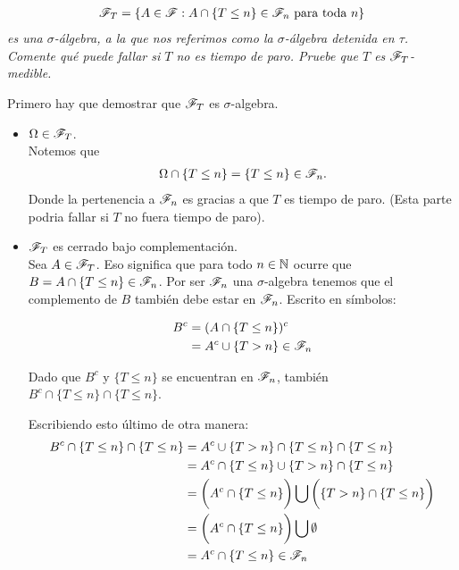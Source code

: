 \emph{
	\begin{align}
		\mathscr{F}_T=\left\{ A\in\mathscr{F}:A\cap\left\{ T\leq n\right\} \in\mathscr{F}_n\text{ para toda } n\right\} 
	\end{align}
	es una $\sigma$-\'algebra, 
	a la que nos referimos como la $\sigma$-\'algebra detenida en $\tau$. Comente qu\'e puede fallar si $T$ no es tiempo de paro. 
	Pruebe que $T$ es $\mathscr{F}_T$-medible.\\		
}			
		
	Primero hay que demostrar que $\mathscr{F}_T$ es $\sigma$-algebra.\\
	
	\begin{itemize}
		\item $\Omega \in \mathscr{F}_T$. \\
		
			Notemos que 
			\begin{align}
				\Omega \cap \{T \leq n\} = \{T \leq n\} \in \mathscr{F}_n.
			\end{align}
			Donde la pertenencia a $\mathscr{F}_n$ es gracias a que $T$ es tiempo de paro. (Esta parte podria fallar si 
			$T$ no fuera tiempo de paro).\\
		
		\item $\mathscr{F}_T$ es cerrado bajo complementación.\\
		
			Sea $A \in \mathscr{F}_T$. Eso significa que para todo $n \in  \mathbb{N}$ ocurre que $B = A \cap \{ T \leq n \} \in \mathscr{F}_n$. 
			Por ser $\mathscr{F}_n$ una $\sigma$-algebra tenemos que el complemento de $B$ también debe estar en $\mathscr{F}_n$. 
			Escrito en símbolos:
			
			\begin{align}
				B^c 	&= (A   \cap \{ T \leq n \})^c \\
						&=  A^c \cup \{ T > n \} \in \mathscr{F}_n
			\end{align}
			
			Dado que $B^c$ y $\{ T \leq n \}$ se encuentran en $\mathscr{F}_n$, también $B^c \cap \{ T \leq n \} \cap \{ T \leq n \}$.
			
			Escribiendo esto último de otra manera:
			\begin{align}
				B^c \cap \{ T \leq n \} \cap \{ T \leq n \} 	&=		A^c \cup \{ T > n \} \cap \{ T \leq n \} \cap \{ T \leq n \} \\
																&= 		A^c \cap \{ T \leq n \} \cup \{ T > n \} \cap \{ T \leq n \} \\
																&= 		\bigg(A^c \cap \{ T \leq n \}\bigg) 
																			\bigcup 
																		\bigg(\{ T > n \} \cap \{ T \leq n \}\bigg) \\
																&=		\bigg(A^c \cap \{ T \leq n \}\bigg)	\bigcup \emptyset \\
																&=		A^c \cap \{ T \leq n \} \in \mathscr{F}_n
			\end{align}
			

\end{itemize}
